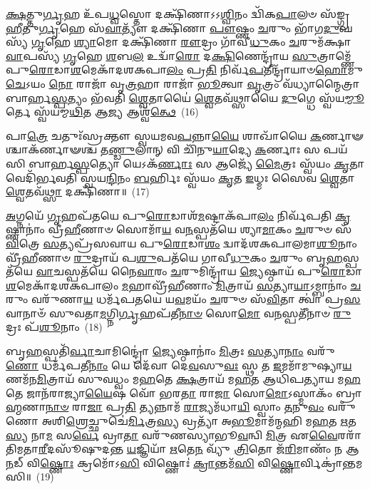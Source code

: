\-\ul{𑌕𑍍𑌷}\-𑌤𑍍𑌤𑍁\-\ul{𑌰𑍍𑌗𑍃}\-𑌹 𑌉᳴𑌪\-\ul{𑌧𑍍𑌵}\-𑌸𑍍𑌤𑍋 𑌦𑌕𑍍𑌷𑌿᳴𑌣𑌾\-𑌽\-𑌽\-\ul{𑌶𑍍𑌵𑌿}\-𑌨𑌂 𑌦𑍍𑌵𑌿᳴𑌕\-\ul{𑌪𑌾}\-𑌲𑍞 𑌸᳴𑌙𑍍𑌗𑍍𑌰\-\ul{𑌹𑍀}\-𑌤𑍁\-\ul{𑌰𑍍𑌗𑍃}\-𑌹𑍇 𑌸᳴\-\ul{𑌵𑌾}\-𑌤𑍍𑌯𑍗᳴ 𑌦𑌕𑍍𑌷𑌿᳴𑌣𑌾 \ul{𑌪𑍗}\-𑌷𑍍𑌣𑌂 \ul{𑌚}\-𑌰𑍁𑌂 𑌭𑌾᳴𑌗\-\ul{𑌦𑍁}\-𑌘𑌸𑍍𑌯᳴ \ul{𑌗𑍃}\-𑌹𑍇 \ul{𑌶𑍍𑌯𑌾}\-𑌮𑍋 𑌦𑌕𑍍𑌷𑌿᳴𑌣𑌾 \ul{𑌰𑍗}\-𑌦𑍍𑌰𑌂 𑌗𑌾᳴𑌵𑍀\-\ul{𑌧𑍁}\-𑌕𑌂 \ul{𑌚}\-𑌰𑍁𑌮᳴𑌕𑍍𑌷𑌾\-\ul{𑌵𑌾}\-𑌪𑌸𑍍𑌯᳴ \ul{𑌗𑍃}\-𑌹𑍇 \ul{𑌶}\-𑌬\-\ul{𑌲} 𑌉𑌦𑍍𑌵𑌾᳴\-\ul{𑌰𑍋} 𑌦\-\ul{𑌕𑍍𑌷𑌿}\-𑌣𑍇𑌨𑍍𑌦𑍍𑌰𑌾᳴𑌯 \ul{𑌸𑍁}\-𑌤𑍍𑌰𑌾𑌮𑍍𑌣𑍇᳴ 𑌪𑍁\-\ul{𑌰𑍋}\-𑌡𑌾\-\ul{𑌶}\-𑌮𑍇𑌕𑌾᳴\-𑌦𑌶\-𑌕𑌪𑌾\-\ul{𑌲𑌂} 𑌪𑍍𑌰\-\ul{𑌤𑌿} 𑌨𑌿𑌰𑍍𑌵᳴\-\ul{𑌪}\-𑌤𑍀𑌨𑍍𑌦𑍍𑌰𑌾᳴𑌯𑌾𑍞\-\ul{𑌹𑍋}\-𑌮𑍁\-\ul{𑌚𑍇}\-\-𑌽𑌯𑌂 \ul{𑌨𑍋} 𑌰𑌾𑌜𑌾᳴ 𑌵𑍃\-\ul{𑌤𑍍𑌰}\-𑌹𑌾 𑌰𑌾𑌜𑌾᳴ \ul{𑌭𑍂}\-𑌤𑍍𑌵𑌾 \ul{𑌵𑍃}\-𑌤𑍍𑌰𑌂 𑌵᳴𑌧𑍍𑌯𑌾𑌨𑍍𑌮𑍈𑌤𑍍𑌰𑌾𑌬𑌾𑌰𑍍\mbox{}𑌹\-\ul{𑌸𑍍𑌪}\-𑌤𑍍𑌯𑌂 𑌭᳴𑌵𑌤𑌿 \ul{𑌶𑍍𑌵𑍇}\-𑌤𑌾𑌯𑍈॑ \ul{𑌶𑍍𑌵𑍇}\-𑌤𑌵᳴𑌥𑍍𑌸𑌾𑌯𑍈 \ul{𑌦𑍁}\-𑌗𑍍𑌧𑍇 𑌸𑍍𑌵᳴𑌯\-\ul{𑌮𑍍𑌮𑍂}\-𑌰𑍍𑌤𑍇 𑌸𑍍𑌵᳴𑌯𑌮𑍍𑌮\-\ul{𑌥𑌿}\-𑌤 𑌆\-\ul{𑌜𑍍𑌯} 𑌆𑌶𑍍𑌵᳴\-\ul{𑌤𑍍𑌥𑍇}\-~(16)

𑌪𑌾\-\ul{𑌤𑍍𑌰𑍇} 𑌚𑌤𑍁𑌃᳴𑌸𑍍𑌰𑌕𑍍𑌤𑍗 𑌸𑍍𑌵𑌯𑌮𑌵\-\ul{𑌪}\-𑌨𑍍𑌨𑌾\-\ul{𑌯𑍈} 𑌶𑌾𑌖𑌾᳴𑌯𑍈 \ul{𑌕}\-𑌰𑍍𑌣𑌾𑍟𑌶𑍍𑌚𑌾\-𑌕᳴𑌰𑍍𑌣𑌾𑍟𑌶𑍍𑌚 𑌤\-\ul{𑌣𑍍𑌡𑍁}\-𑌲𑌾𑌨𑍍 𑌵𑌿 𑌚𑌿᳴𑌨𑍁\-\ul{𑌯𑌾}\-𑌦𑍍𑌯𑍇 \ul{𑌕}\-𑌰𑍍𑌣𑌾𑌃 𑌸 𑌪𑌯᳴𑌸𑌿 𑌬𑌾𑌰𑍍\mbox{}𑌹\-\ul{𑌸𑍍𑌪}\-𑌤𑍍𑌯𑍋 𑌯𑍇\-𑌽𑌕᳴\-\ul{𑌰𑍍𑌣𑌾𑌃} 𑌸 𑌆𑌜𑍍𑌯𑍇᳴ \ul{𑌮𑍈}\-𑌤𑍍𑌰𑌃 𑌸𑍍𑌵᳴𑌯𑌂 \ul{𑌕𑍃}\-𑌤𑌾 𑌵𑍇𑌦𑌿᳴𑌰𑍍𑌭𑌵𑌤𑌿 𑌸𑍍𑌵𑌯\-\ul{𑌨𑍍𑌦𑌿}\-𑌨𑌂 \ul{𑌬}\-𑌰𑍍\mbox{}𑌹𑌿𑌃 𑌸𑍍𑌵᳴𑌯𑌂 \ul{𑌕𑍃}\-𑌤 \ul{𑌇}\-𑌧𑍍𑌮𑌃 𑌸𑍈𑌵 \ul{𑌶𑍍𑌵𑍇}\-𑌤𑌾 \ul{𑌶𑍍𑌵𑍇}\-𑌤𑌵᳴\-\ul{𑌥𑍍𑌸𑌾} 𑌦𑌕𑍍𑌷𑌿᳴𑌣𑌾॥~(17)


{\anuvakamend[{\-\ul{𑌸𑌾}\-\-\ul{𑌵𑌿}\-𑌤𑍍𑌰𑌂 𑌦𑍍𑌵𑌾𑌦᳴𑌶\-𑌕𑌪𑌾\-\ul{𑌲}\-𑌮𑌾𑌶𑍍𑌵᳴\-\ul{𑌤𑍍𑌥𑍇} 𑌤𑍍𑌰𑌯᳴𑌸𑍍𑌤𑍍𑌰𑌿𑍞𑌶𑌚𑍍𑌚}]}%

\-\ul{𑌅}\-𑌗𑍍𑌨𑌯𑍇᳴ \ul{𑌗𑍃}\-𑌹𑌪᳴𑌤𑌯𑍇 𑌪𑍁\-\ul{𑌰𑍋}\-𑌡𑌾𑌶᳴\-\-\ul{𑌮}\-𑌷𑍍𑌟𑌾\-𑌕᳴𑌪𑌾\-\ul{𑌲𑌂} 𑌨𑌿𑌰𑍍𑌵᳴𑌪𑌤𑌿 \ul{𑌕𑍃}\-𑌷𑍍𑌣𑌾𑌨𑌾𑌂॑ 𑌵𑍍𑌰𑍀\-\ul{𑌹𑍀}\-𑌣𑌾𑍞 𑌸𑍋𑌮𑌾᳴\-\ul{𑌯} 𑌵\-\ul{𑌨}\-𑌸𑍍𑌪𑌤᳴𑌯𑍇 𑌶𑍍𑌯𑌾\-\ul{𑌮𑌾}\-𑌕𑌂 \ul{𑌚}\-𑌰𑍁𑍞 𑌸᳴\-\ul{𑌵𑌿}\-𑌤𑍍𑌰𑍇 \ul{𑌸}\-𑌤𑍍𑌯𑌪𑍍𑌰᳴𑌸𑌵𑌾𑌯 𑌪𑍁\-\ul{𑌰𑍋}\-𑌡𑌾\-\ul{𑌶𑌂} 𑌦𑍍𑌵𑌾𑌦᳴𑌶\-𑌕𑌪𑌾𑌲𑌮𑌾\-\ul{𑌶𑍂}\-𑌨𑌾𑌂 𑌵𑍍𑌰𑍀᳴\-\ul{𑌹𑍀}\-𑌣𑌾𑍞 \ul{𑌰𑍁}\-𑌦𑍍𑌰𑌾𑌯᳴ 𑌪\-\ul{𑌶𑍁}\-𑌪𑌤᳴𑌯𑍇 𑌗𑌾𑌵𑍀\-\ul{𑌧𑍁}\-𑌕𑌂 \ul{𑌚}\-𑌰𑍁𑌂 𑌬𑍃\-\ul{𑌹}\-𑌸𑍍𑌪𑌤᳴𑌯𑍇 \ul{𑌵𑌾}\-𑌚𑌸𑍍𑌪𑌤᳴𑌯𑍇 𑌨𑍈\-\ul{𑌵𑌾}\-𑌰𑌂 \ul{𑌚}\-𑌰𑍁𑌮𑌿𑌨𑍍𑌦𑍍𑌰𑌾᳴𑌯 \ul{𑌜𑍍𑌯𑍇}\-𑌷𑍍𑌠𑌾𑌯᳴ 𑌪𑍁\-\ul{𑌰𑍋}\-𑌡𑌾\-\ul{𑌶}\-𑌮𑍇𑌕𑌾᳴\-𑌦𑌶\-𑌕𑌪𑌾𑌲𑌂 \ul{𑌮}\-𑌹𑌾𑌵𑍍𑌰𑍀᳴𑌹𑍀𑌣𑌾𑌂 \ul{𑌮𑌿}\-𑌤𑍍𑌰𑌾𑌯᳴ \ul{𑌸}\-𑌤𑍍𑌯𑌾\-\ul{𑌯𑌾}\-\-𑌽𑌮𑍍𑌬𑌾𑌨𑌾𑌂॑ \ul{𑌚}\-𑌰𑍁𑌂 𑌵𑌰𑍁᳴𑌣𑌾\-\ul{𑌯} 𑌧𑌰𑍍𑌮᳴𑌪𑌤𑌯𑍇 𑌯\-\ul{𑌵}\-𑌮𑌯𑌂᳴ \ul{𑌚}\-𑌰𑍁𑍞 𑌸᳴\-\ul{𑌵𑌿}\-𑌤𑌾 𑌤𑍍𑌵𑌾॑ 𑌪𑍍𑌰\-\ul{𑌸}\-𑌵𑌾𑌨𑌾𑍞᳴ 𑌸𑍁𑌵𑌤𑌾\-\ul{𑌮}\-𑌗𑍍𑌨𑌿\-\ul{𑌰𑍍𑌗𑍃}\-𑌹𑌪᳴𑌤𑍀\-\ul{𑌨𑌾}\-\-\ul{𑍞} 𑌸𑍋\-\ul{𑌮𑍋} 𑌵\-\ul{𑌨}\-𑌸𑍍𑌪𑌤𑍀᳴𑌨𑌾𑍞 \ul{𑌰𑍁}\-𑌦𑍍𑌰𑌃 𑌪᳴\-\ul{𑌶𑍂}\-𑌨𑌾𑌂~(18)

𑌬𑍃\-\ul{𑌹}\-𑌸𑍍𑌪𑌤𑌿᳴\-\ul{𑌰𑍍𑌵𑌾}\-𑌚𑌾𑌮𑌿𑌨𑍍𑌦𑍍𑌰𑍋॑ \ul{𑌜𑍍𑌯𑍇}\-𑌷𑍍𑌠𑌾𑌨𑌾𑌂॑ \ul{𑌮𑌿}\-𑌤𑍍𑌰𑌃 \ul{𑌸}\-𑌤𑍍𑌯𑌾\-\ul{𑌨𑌾𑌂} 𑌵𑌰𑍁᳴\-\ul{𑌣𑍋} 𑌧𑌰𑍍𑌮᳴𑌪𑌤𑍀\-\ul{𑌨𑌾𑌂} 𑌯𑍇 𑌦𑍇᳴𑌵𑌾 𑌦𑍇\-\ul{𑌵}\-𑌸𑍁\-\ul{𑌵𑌃} 𑌸𑍍𑌥 𑌤 \ul{𑌇}\-𑌮𑌮𑌾᳴𑌮𑍁𑌷𑍍𑌯𑌾\-\ul{𑌯}\-𑌣𑌮᳴\-𑌨\-\ul{𑌮𑌿}\-𑌤𑍍𑌰𑌾𑌯᳴ 𑌸𑍁𑌵𑌧𑍍𑌵𑌂 𑌮\-\ul{𑌹}\-𑌤𑍇 \ul{𑌕𑍍𑌷}\-𑌤𑍍𑌰𑌾𑌯᳴ 𑌮\-\ul{𑌹}\-𑌤 𑌆𑌧𑌿᳴𑌪𑌤𑍍𑌯𑌾𑌯 𑌮\-\ul{𑌹}\-𑌤𑍇 𑌜𑌾𑌨᳴𑌰𑌾𑌜𑍍𑌯𑌾\-\ul{𑌯𑍈}\-𑌷 𑌵𑍋᳴ 𑌭𑌰\-\ul{𑌤𑌾} 𑌰𑌾\-\ul{𑌜𑌾} 𑌸𑍋\-\ul{𑌮𑍋}\-\-𑌽𑌸𑍍𑌮𑌾𑌕𑌂᳴ 𑌬𑍍𑌰𑌾\-\ul{𑌹𑍍𑌮}\-𑌣𑌾\-\ul{𑌨𑌾}\-\-\ul{𑍞} 𑌰𑌾\-\ul{𑌜𑌾} 𑌪𑍍𑌰\-\ul{𑌤𑌿} 𑌤𑍍𑌯𑌨𑍍𑌨𑌾𑌮᳴ \ul{𑌰𑌾}\-𑌜𑍍𑌯𑌮᳴𑌧𑌾\-\ul{𑌯𑌿} 𑌸𑍍𑌵𑌾𑌂 \ul{𑌤}\-𑌨𑍁\-\ul{𑌵𑌂} 𑌵𑌰𑍁᳴𑌣𑍋 𑌅𑌶𑌿\-\ul{𑌶𑍍𑌰𑍇}\-𑌚𑍍𑌛𑍁𑌚𑍇॑\-\ul{𑌰𑍍𑌮𑌿}\-𑌤𑍍𑌰\-\ul{𑌸𑍍𑌯} 𑌵𑍍𑌰𑌤𑍍𑌯𑌾᳴ 𑌅\-\ul{𑌭𑍂}\-𑌮𑌾𑌮᳴𑌨𑍍𑌮𑌹𑌿 𑌮\-\ul{𑌹}\-𑌤 \ul{𑌋}\-𑌤\-\ul{𑌸𑍍𑌯} 𑌨𑌾\-\ul{𑌮} 𑌸\-\ul{𑌰𑍍𑌵𑍇} 𑌵𑍍𑌰𑌾\-\ul{𑌤𑌾} 𑌵𑌰𑍁᳴𑌣𑌸𑍍𑌯𑌾𑌭𑍂\-\ul{𑌵}\-𑌨𑍍𑌵𑌿 \ul{𑌮𑌿}\-𑌤𑍍𑌰 𑌏\-\ul{𑌵𑍈}\-𑌰𑌰𑌾᳴𑌤𑌿𑌮𑌤𑌾\-\ul{𑌰𑍀}\-𑌦𑌸𑍂᳴𑌷𑍁𑌦𑌨𑍍𑌤 \ul{𑌯}\-𑌜𑍍𑌞𑌿𑌯𑌾᳴ \ul{𑌋}\-𑌤𑍇\-\ul{𑌨} 𑌵𑍍𑌯𑍁᳴ \ul{𑌤𑍍𑌰𑌿}\-𑌤𑍋 𑌜᳴\-\ul{𑌰𑌿}\-𑌮𑌾𑌣𑌂᳴ 𑌨 𑌆\-\ul{𑌨}\-𑌡𑍍 𑌵𑌿\-\ul{𑌷𑍍𑌣𑍋𑌃} 𑌕𑍍𑌰𑌮𑍋᳴\-𑌽\-\ul{𑌸𑌿} 𑌵𑌿𑌷𑍍𑌣𑍋𑌃॑ \ul{𑌕𑍍𑌰𑌾}\-𑌨𑍍𑌤𑌮᳴\-\ul{𑌸𑌿} 𑌵𑌿\-\ul{𑌷𑍍𑌣𑍋}\-𑌰𑍍𑌵𑌿𑌕𑍍𑌰𑌾॑𑌨𑍍𑌤𑌮𑌸𑌿॥~(19)

